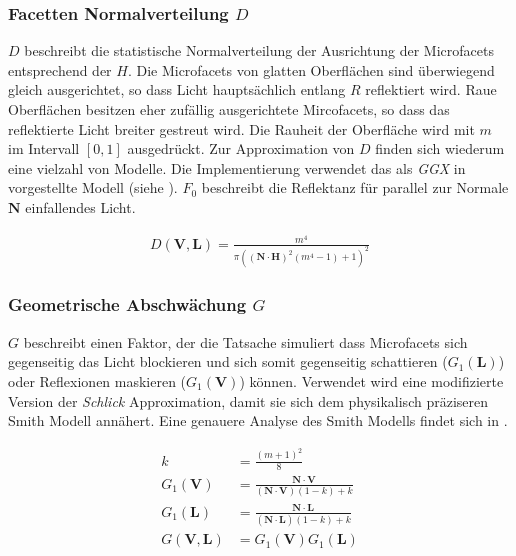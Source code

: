 \subsubsection[Facetten Normalverteilung]{Facetten Normalverteilung $D$} 
$D$ beschreibt die statistische Normalverteilung der Ausrichtung der Microfacets entsprechend der  $H$. Die Microfacets von glatten Oberflächen sind überwiegend gleich ausgerichtet, so dass Licht hauptsächlich entlang $R$ reflektiert wird. Raue Oberflächen besitzen eher zufällig ausgerichtete Mircofacets, so dass das reflektierte Licht breiter gestreut wird. Die Rauheit der Oberfläche wird mit $m$ im Intervall $[0,1]$ ausgedrückt. Zur Approximation von $D$ finden sich wiederum eine vielzahl von Modelle. Die Implementierung verwendet das als \textit{GGX} in \cite{Walter2007} vorgestellte Modell (siehe ). $F_0$ beschreibt die Reflektanz für parallel zur Normale $\mathbf N$ einfallendes Licht.

\begin{align}
	\label{eq:ggx}
	D(\mathbf V,\mathbf L) = \frac{m^4}{ \pi \left(\left( \mathbf N \cdot \mathbf H \right)^2\left(m^4 - 1\right) + 1\right)^2}
\end{align}


\subsubsection[Geometrische Abschwächung]{Geometrische Abschwächung $G$} 
$G$ beschreibt einen Faktor, der die Tatsache simuliert dass Microfacets sich gegenseitig das Licht blockieren und sich somit gegenseitig schattieren ($G_1(\mathbf L)$) oder Reflexionen maskieren ($G_1(\mathbf V)$) können. Verwendet wird eine modifizierte Version der \textit{Schlick} Approximation, damit sie sich dem physikalisch präziseren Smith Modell annähert. Eine genauere Analyse des Smith Modells findet sich in \cite[Kapitel 6, Seite 33]{Heitz2014}.

\begin{align}
	\label{eq:geometric-schlick}
	k &= \frac{(m + 1)^2}{8}\\
	G_1(\mathbf V) &= \frac{\mathbf N \cdot \mathbf V}{(\mathbf N \cdot \mathbf V)(1-k)+k}\\
	G_1(\mathbf L) &= \frac{\mathbf N \cdot \mathbf L}{(\mathbf N \cdot \mathbf L)(1-k)+k}\\
	G(\mathbf V,\mathbf L) &= G_1(\mathbf V) G_1(\mathbf L)
\end{align}


